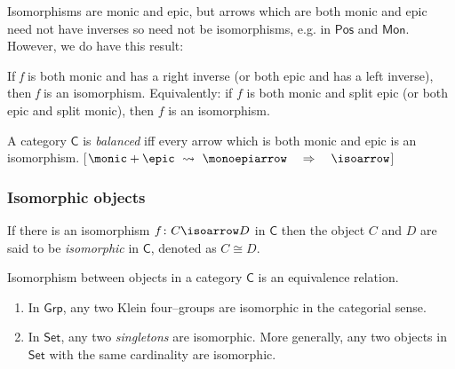 Isomorphisms are monic and epic, 
but arrows which are both monic and epic need not have inverses so need not be isomorphisms, e.g. in $\mathsf{Pos}$ and $\mathsf{Mon}$. 
However, we do have this result:


\begin{thm}
	If \textit{f} is both monic and has a right inverse (or both epic and has a left inverse), 
	then \textit{f} is an isomorphism. 
	Equivalently: 
	if $f$ is both monic and split epic (or both epic and split monic), 
	then $f$ is an isomorphism.
\end{thm}




\begin{df}
	A category $\mathsf{C}$ is \textit{balanced} iff every arrow which is both monic and epic is an isomorphism. 
	[$\monic + \epic ~\leadsto~ \monoepiarrow \quad \Rightarrow \quad \isoarrow$]
\end{df}






\subsubsection{Isomorphic objects}


\begin{df}
	If there is an isomorphism $f \colon C \isoarrow D$ in $\mathsf{C}$ then the object $C$ and $D$ are said to be \textit{isomorphic} in $\mathsf{C}$, 
	denoted as $C \cong D$.
\end{df}


\begin{prop}
	Isomorphism between objects in a category $\mathsf{C}$ is an equivalence relation.
\end{prop}




\begin{example}
	\begin{enumerate}[itemsep=5pt,parsep=5pt,leftmargin=3em,topsep=5pt,label=(\alph*)] %
		\item 
		In $\mathsf{Grp}$, 
		any two Klein four--groups are isomorphic in the categorial sense.

		\item 
		In $\mathsf{Set}$, 
		any two \textit{singletons} are isomorphic. 
		More generally, 
		any two objects in $\mathsf{Set}$ with the same cardinality are isomorphic.
	\end{enumerate}
	
\end{example}


